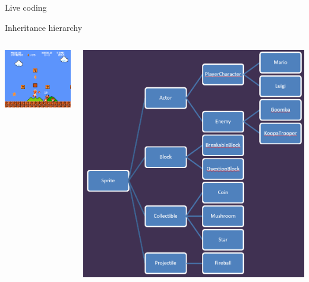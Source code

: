 \begin{frame}{Live coding}
\end{frame}

\begin{frame}{Inheritance hierarchy}
	\begin{columns}
		\pause
		\begin{column}{0.3\textwidth}
			\includegraphics[width=\textwidth]{mario}
		\end{column}
		\pause
		\begin{column}{0.68\textwidth}
			\includegraphics[width=\textwidth]{hierarchy}
		\end{column}
	\end{columns}
\end{frame}

